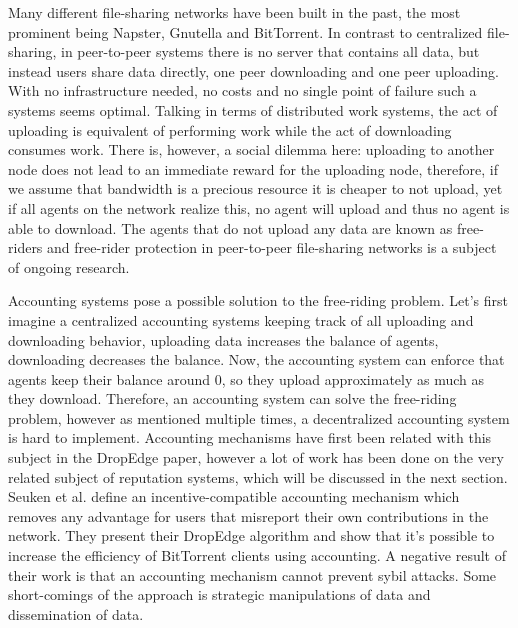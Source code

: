 Many different file-sharing networks have been built in the past, the most prominent being Napster,
Gnutella and BitTorrent. In contrast to centralized file-sharing, in peer-to-peer systems there is 
no server that contains all data, but instead users share data directly, one peer downloading and 
one peer uploading. With no infrastructure needed, no costs and no single point of failure such a
systems seems optimal. Talking in terms of distributed work systems, the act of uploading is 
equivalent of performing work while the act of downloading consumes work. There is, however, a 
social dilemma here: uploading to another node does not lead to an immediate reward for the
uploading node, therefore, if we assume that bandwidth is a precious resource it is cheaper to not 
upload, yet if all agents on the network realize this, no agent will upload and thus no agent is 
able to download. The agents that do not upload any data are known as free-riders and free-rider 
protection in peer-to-peer file-sharing networks is a subject of ongoing research.

Accounting systems pose a possible solution to the free-riding problem. Let's first imagine a 
centralized accounting systems keeping track of all uploading and downloading behavior, uploading 
data increases the balance of agents, downloading decreases the balance. Now, the accounting system
can enforce that agents keep their balance around 0, so they upload approximately as much as they
download. Therefore, an accounting system can solve the free-riding problem, however as mentioned 
multiple times, a decentralized accounting system is hard to implement. Accounting mechanisms have
first been related with this subject in the DropEdge paper, however a lot of work has been done on
the very related subject of reputation systems, which will be discussed in the next section. Seuken
et al. define an incentive-compatible accounting mechanism which removes any advantage for users 
that misreport their own contributions in the network. They present their DropEdge algorithm and 
show that it's possible to increase the efficiency of BitTorrent clients using accounting. A 
negative result of their work is that an accounting mechanism cannot prevent sybil attacks. Some
short-comings of the approach is strategic manipulations of data and dissemination of data. 

